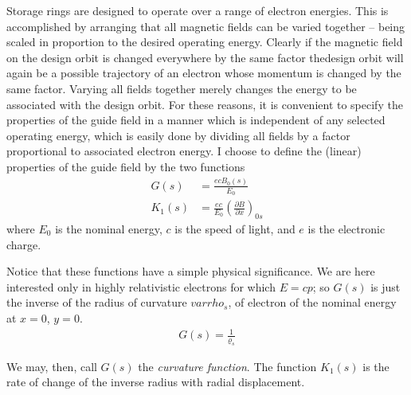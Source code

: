 Storage rings are designed to operate over a range of electron energies. This is accomplished  by arranging that all magnetic fields can be varied together -- being scaled in proportion to the desired operating energy. Clearly if the magnetic field on the design orbit is changed everywhere by the same factor thedesign orbit will again be a possible trajectory of an electron whose momentum is changed by the same factor. Varying all fields together merely changes the energy to be associated with the design orbit. For these reasons, it is convenient to specify the properties of the guide field in a manner which is independent of any selected operating energy, which is easily done by dividing all fields by a factor proportional to associated electron energy. I choose to define the (linear) properties of the guide field by the two functions
\begin{align}\label{eq:2.3}
	G(s) &= \frac{ecB_0(s)}{E_0}\\
	K_1(s) &= \frac{ec}{E_0} \left(\frac{\partial B}{\partial x}\right)_{0s} \label{eq:2.4}
\end{align}
where $E_0$ is the nominal energy, $c$ is the speed of light, and $e$ is the electronic charge.

Notice that these functions have a simple physical significance. We are here interested only in highly relativistic electrons for which $E = cp$; so $G(s)$ is just the inverse of the radius of curvature $varrho_s$, of electron of the nominal energy at $x = 0$, $y = 0$.
\begin{align}
	G(s) = \frac{1}{\varrho_s}
\end{align}

We may, then, call $G(s)$ the \textit{curvature function}. The function $K_1(s)$ is the rate of change of the inverse radius with radial displacement.

